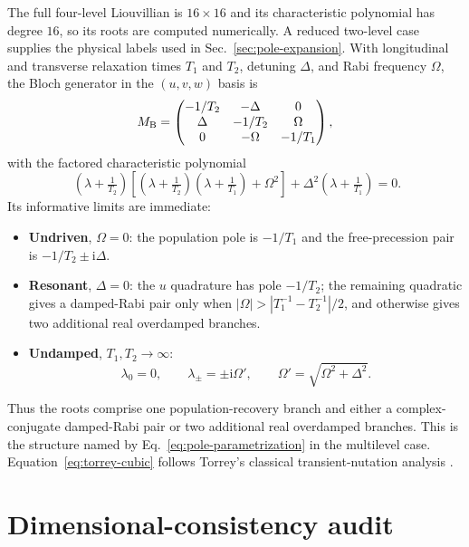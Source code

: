 \documentclass[11pt,a4paper]{article}
\newcommand{\ii}{\mathrm i}
\begin{document}
The full four-level Liouvillian is $16\times16$ and its characteristic
polynomial has degree $16$, so its roots are computed numerically. A reduced
two-level case supplies the physical labels used in
Sec.~\ref{sec:pole-expansion}. With longitudinal and transverse relaxation
times $T_1$ and $T_2$, detuning $\Delta$, and Rabi frequency $\Omega$, the
Bloch generator in the $(u,v,w)$ basis is
\begin{equation}
M_{\rm B}=
\begin{pmatrix}
-1/T_2 & -\Delta & 0\\
\Delta & -1/T_2 & \Omega\\
0 & -\Omega & -1/T_1
\end{pmatrix},
\label{eq:bloch-generator}
\end{equation}
with the factored characteristic polynomial
\begin{equation}
\boxed{\;
\left(\lambda+\tfrac1{T_2}\right)
\left[\left(\lambda+\tfrac1{T_2}\right)\left(\lambda+\tfrac1{T_1}\right)
+\Omega^2\right]
+\Delta^2\left(\lambda+\tfrac1{T_1}\right)=0 .}
\label{eq:torrey-cubic}
\end{equation}
Its informative limits are immediate:
\begin{itemize}
\item \textbf{Undriven}, $\Omega=0$: the population pole is $-1/T_1$ and the
free-precession pair is $-1/T_2\pm\ii\Delta$.
\item \textbf{Resonant}, $\Delta=0$: the $u$ quadrature has pole $-1/T_2$;
the remaining quadratic gives a damped-Rabi pair only when
$|\Omega|>|T_1^{-1}-T_2^{-1}|/2$, and otherwise gives two additional real
overdamped branches.
\item \textbf{Undamped}, $T_1,T_2\to\infty$:
\begin{equation}
\lambda_0=0,\qquad
\lambda_\pm=\pm\ii\Omega',\qquad
\Omega'=\sqrt{\Omega^2+\Delta^2}.
\label{eq:generalized-rabi}
\end{equation}
\end{itemize}
Thus the roots comprise one population-recovery branch and either a
complex-conjugate damped-Rabi pair or two additional real overdamped branches.
This is the structure named by Eq.~\eqref{eq:pole-parametrization} in the
multilevel case. Equation~\eqref{eq:torrey-cubic} follows Torrey's classical
transient-nutation analysis \cite{Torrey1949}.

\section{Dimensional-consistency audit}
\end{document}
